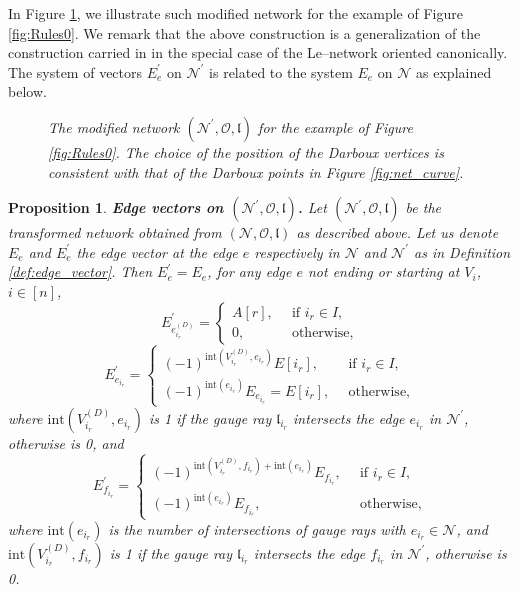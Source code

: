 \documentclass[11pt]{amsart}
\theoremstyle{plain}
\numberwithin{equation}{section}
\newtheorem{proposition}[theorem]{Proposition}
\begin{document}
In Figure \ref{fig:Nprime}, we illustrate such modified network for the example of Figure \ref{fig:Rules0}.
We remark that the above construction is a generalization of the construction carried in \cite{AG3} in the special case of the Le--network oriented canonically. The system of vectors $E_e^{\prime}$ on ${\mathcal N}^{\prime}$ is related to the system $E_e$ on $\mathcal N$ as explained below.
\begin{figure}
  \caption{\small{\sl The modified network $({\mathcal N}^{\prime}, {\mathcal O}, \mathfrak l)$ for the example of Figure \ref{fig:Rules0}. The choice of the position of the Darboux vertices is consistent with that of the Darboux points in Figure \ref{fig:net_curve}.}\label{fig:Nprime}}
\end{figure}
\begin{proposition}\label{prop:ext_syst}\textbf{Edge vectors on $({\mathcal N}^{\prime}, \mathcal O, \mathfrak{l})$.}
Let $(\mathcal N^{\prime}, \mathcal O, \mathfrak{l})$ be the transformed network obtained from $(\mathcal N, \mathcal O, \mathfrak{l})$ as described above.  Let us denote $E_e$ and $E_e^{\prime}$ the edge vector at the edge $e$ respectively in $\mathcal N$ and $\mathcal N^{\prime}$ as in Definition \ref{def:edge_vector}. Then
$E^{\prime}_e =E_e$, for any edge $e$ not ending or starting at $V_i$, $i\in [n]$,
\begin{equation}\label{eq:darboux_edge}
E^{\prime}_{e^{(D)}_{i_r}} = \left\{ \begin{array}{ll}
A[r], & \, \mbox{ if } i_r \in I,\\
0, & \, \mbox{ otherwise},
\end{array}
\right.
\end{equation}
\begin{equation}\label{eq:darboux_source}
E^{\prime}_{e_{i_r}} = \left\{ \begin{array}{ll}
(-1)^{\mbox{int}(V^{(D)}_{i_r},e_{i_r})} E [i_r], & \, \mbox{ if } i_r \in I,\\
(-1)^{\mbox{int}(e_{i_r})} E_{e_{i_r}}=E [i_r], & \, \mbox{ otherwise},
\end{array}
\right.
\end{equation}
where $\mbox{int}(V^{(D)}_{i_r},e_{i_r})$ is 1 if the gauge ray $\mathfrak{l}_{i_r}$ intersects the edge $e_{i_r}$ in $\mathcal N^{\prime}$, otherwise is 0,
and
\begin{equation}\label{eq:darboux_edge_2}
E^{\prime}_{f_{i_r}} = \left\{ \begin{array}{ll}
(-1)^{\mbox{int}(V^{(D)}_{i_r},f_{i_r})+\mbox{int}(e_{i_r})} E_{f_{i_r}}, & \, \mbox{ if } i_r \in I,\\
(-1)^{\mbox{int}(e_{i_r})}E_{f_{i_r}}, & \, \mbox{ otherwise},
\end{array}
\right.
\end{equation}
where $\mbox{int}(e_{i_r})$ is the number of intersections of gauge rays with $e_{i_r}\in \mathcal N$,  and $\mbox{int}(V^{(D)}_{i_r},f_{i_r})$ is 1 if the gauge ray $\mathfrak{l}_{i_r}$ intersects the edge $f_{i_r}$ in $\mathcal N^{\prime}$, otherwise is 0.
\end{proposition}
\end{document}
